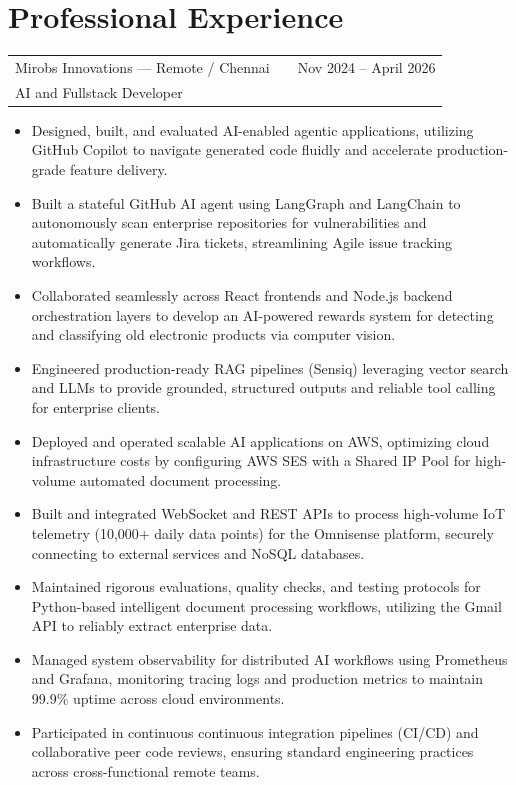 \documentclass[a4paper,10pt]{article}
\begin{document}
\section{Professional Experience}
\begin{tabularx}{\linewidth}{ @{}l X r@{} }
Mirobs Innovations — Remote / Chennai & & \hfill Nov 2024 -- April 2026 \\
AI and Fullstack Developer & & \\
\end{tabularx}
\begin{itemize}[nosep, leftmargin=2em]

\item Designed, built, and evaluated AI-enabled agentic applications, utilizing GitHub Copilot to navigate generated code fluidly and accelerate production-grade feature delivery.

\item Built a stateful GitHub AI agent using LangGraph and LangChain to autonomously scan enterprise repositories for vulnerabilities and automatically generate Jira tickets, streamlining Agile issue tracking workflows.

\item Collaborated seamlessly across React frontends and Node.js backend orchestration layers to develop an AI-powered rewards system for detecting and classifying old electronic products via computer vision.

\item Engineered production-ready RAG pipelines (Sensiq) leveraging vector search and LLMs to provide grounded, structured outputs and reliable tool calling for enterprise clients.

\item Deployed and operated scalable AI applications on AWS, optimizing cloud infrastructure costs by configuring AWS SES with a Shared IP Pool for high-volume automated document processing.

\item Built and integrated WebSocket and REST APIs to process high-volume IoT telemetry (10,000+ daily data points) for the Omnisense platform, securely connecting to external services and NoSQL databases.

\item Maintained rigorous evaluations, quality checks, and testing protocols for Python-based intelligent document processing workflows, utilizing the Gmail API to reliably extract enterprise data.

\item Managed system observability for distributed AI workflows using Prometheus and Grafana, monitoring tracing logs and production metrics to maintain 99.9\% uptime across cloud environments.

\item Participated in continuous continuous integration pipelines (CI/CD) and collaborative peer code reviews, ensuring standard engineering practices across cross-functional remote teams.

\end{itemize}
\end{document}

